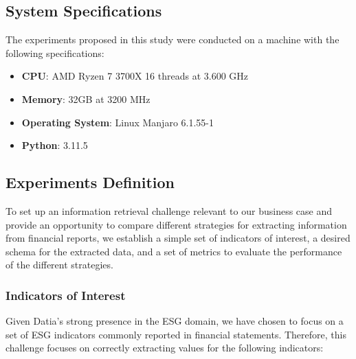\documentclass[english, 12pt, a4paper, elec, utf8, a-2b, online]{aaltothesis}
\begin{document}
\subsection{System Specifications}

The experiments proposed in this study were conducted on a machine with the following specifications:

\begin{itemize}
    \item \textbf{CPU}: AMD Ryzen 7 3700X 16 threads at 3.600 GHz
    \item \textbf{Memory}: 32GB at 3200 MHz
    \item \textbf{Operating System}: Linux Manjaro 6.1.55-1
    \item \textbf{Python}: 3.11.5
\end{itemize}

\subsection{Experiments Definition}

To set up an information retrieval challenge relevant to our business case and provide an opportunity to compare different strategies for extracting information from financial reports, we establish a simple set of indicators of interest, a desired schema for the extracted data, and a set of metrics to evaluate the performance of the different strategies.

\subsubsection{Indicators of Interest}

Given Datia's strong presence in the \ac{ESG} domain, we have chosen to focus on a set of \ac{ESG} indicators commonly reported in financial statements.
Therefore, this challenge focuses on correctly extracting values for the following indicators:
\end{document}
